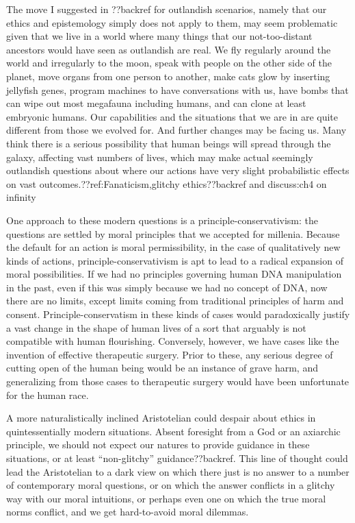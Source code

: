 The move I suggested in ??backref for outlandish scenarios, namely that our ethics and epistemology simply does not apply
to them, may seem problematic given that we live in a world where many things that our not-too-distant ancestors would have
seen as outlandish are real. We fly regularly around the world and irregularly to the moon, speak with people on the other
side of the planet, move organs from one person to another, make cats glow by inserting jellyfish genes, program machines 
to have conversations with us, have bombs that can wipe out most megafauna including humans, and can clone at least embryonic 
humans. Our capabilities and the situations that we are in are quite different from those we evolved for. And further changes
may be facing us. Many think there is a serious possibility that human beings will spread through the galaxy, affecting vast 
numbers of lives, which may make actual seemingly outlandish questions about where our actions have very slight probabilistic 
effects on vast outcomes.??ref:Fanaticism,glitchy ethics??backref and discuss:ch4 on infinity

One approach to these modern questions is a principle-conservativism: the questions are settled by moral principles that we accepted
for millenia. Because the default for an action is moral permissibility, in the case of qualitatively new kinds of actions, 
principle-conservativism is apt to lead to a radical expansion of moral possibilities. If we had no principles governing human DNA
manipulation in the past, even if this was simply because we had no concept of DNA, now there are no limits, except limits coming
from traditional principles of harm and consent. Principle-conservatism in these kinds of cases would paradoxically justify a vast 
change in the shape of human lives of a sort that arguably is not compatible with human flourishing. Conversely, however, we have 
cases like the invention of effective therapeutic surgery. Prior to these, any serious degree of cutting open of the human being would be an instance of grave harm, and generalizing from
those cases to therapeutic surgery would have been unfortunate for the human race. 

A more naturalistically inclined Aristotelian could despair about ethics in quintessentially modern situations. Absent foresight from a God
or an axiarchic principle, we should not expect our natures to provide guidance in these situations, or at least ``non-glitchy''
guidance??backref. This line of thought could lead the Aristotelian to a dark view on which there just is no answer to a number
of contemporary moral questions, or on which the answer conflicts in a glitchy way with our moral intuitions, or perhaps
even one on which the true moral norms conflict, and we get hard-to-avoid moral dilemmas. 

